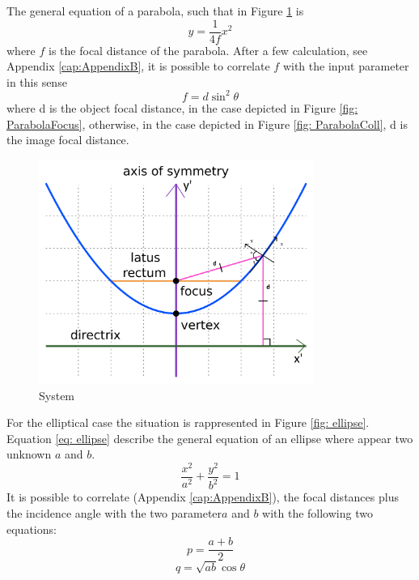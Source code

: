 The general equation of a parabola, such that in  Figure \ref{fig: ParabolaSystem} is
%
\begin{equation}
y = \frac{1}{4f} x^2
\label{eq: parabola}
\end{equation}
%
where $f $ is the focal distance of the parabola. After a few calculation, see Appendix \ref{cap:AppendixB}, it is possible to correlate $f $ with the input parameter in this sense
%
\begin{equation}
f = d \sin^2 \theta
\label{eq: parabola2}
\end{equation}
%
where d is the object focal distance, in the case depicted in Figure \ref{fig: ParabolaFocus}, otherwise, in the case depicted in Figure \ref{fig: ParabolaColl}, d is the image focal distance.
%
\begin{figure}[H]
%
\centering
%
\includegraphics[width=0.8\textwidth]{Immagini/Chapter3/Parab}
%
\caption{System}
%
\label{fig: ParabolaSystem}
%
\end{figure}
For the elliptical case the situation is rappresented in Figure \ref{fig: ellipse}. Equation \ref{eq: ellipse} describe the general equation of an ellipse where appear two unknown $a$ and $b $.
%
\begin{equation}
\frac{x^2}{a^2} + \frac{y^2}{b^2} = 1
\label{eq: ellipse}
\end{equation}
%
It is possible to correlate (Appendix \ref{cap:AppendixB}), the focal distances plus the incidence angle with the two parameter$a$ and $b $ with the following two equations:
%
\begin{equation}
p = \frac{a + b}{2}
\label{eq: 1stEllipseEq}
\end{equation}
%
\begin{equation}
q = \sqrt{ab} \cos\theta
\label{eq: 2ndEllipseEq}
\end{equation}
